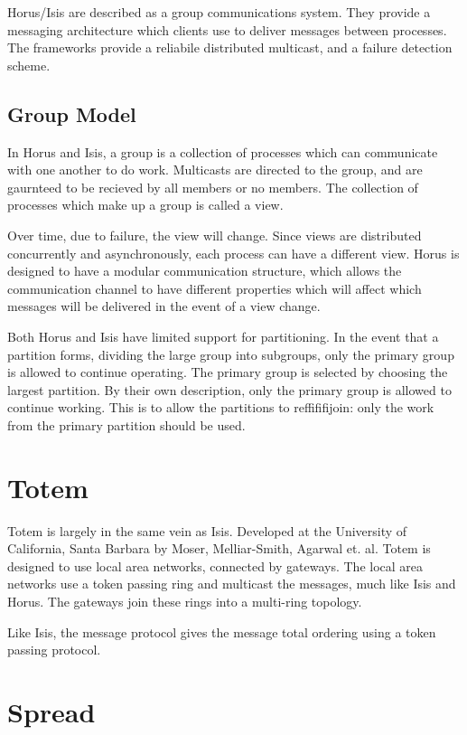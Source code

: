 Horus/Isis are described as a group communications system. They provide a 
messaging architecture which clients use to deliver messages between processes.
The frameworks provide a reliabile distributed multicast, and a failure
detection scheme.

\subsection{Group Model}
In Horus and Isis, a group is a collection of processes which can communicate with one
another to do work. Multicasts are directed to the group, and are gaurnteed to
be recieved by all members or no members. The collection of processes which
make up a group is called a view.

Over time, due to failure, the view will change. Since views are distributed
concurrently and asynchronously, each process can have a different view. Horus
is designed to have a modular communication structure, which allows the 
communication channel to have different properties which will affect which 
messages will be delivered in the event of a view change.

Both Horus and Isis have limited support for partitioning. In the event that
a partition forms, dividing the large group into subgroups, only the primary
group is allowed to continue operating. The primary group is selected by
choosing the largest partition. By their own description, only the primary
group is allowed to continue working. This is to allow the partitions to
reffififijoin: only the work from the primary partition should be used.

\section{Totem}

Totem is largely in the same vein as Isis. Developed at the University of
California, Santa Barbara by Moser, Melliar-Smith, Agarwal et. al. Totem is
designed to use local area networks, connected by gateways. The local area
networks use a token passing ring and multicast the messages, much like Isis
and Horus. The gateways join these rings into a multi-ring topology.

Like Isis, the message protocol gives the message total ordering using a
token passing protocol.

\section{Spread}

